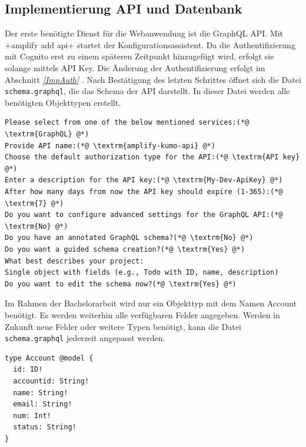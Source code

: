 \subsection{Implementierung API und Datenbank}
Der erste benötigte Dienst für die Webanwendung ist die GraphQL API.
Mit \spverb+amplify add api+ startet der Konfigurationsassistent.
Da die Authentifizierung mit Cognito erst zu einem späteren Zeitpunkt hinzugefügt wird, erfolgt sie solange mittels API Key.
Die Änderung der Authentifizierung erfolgt im Abschnitt \textit{\ref{ImpAuth} }.
Nach Bestätigung des letzten Schrittes öffnet sich die Datei \verb+schema.graphql+, die das Schema der API darstellt.
In dieser Datei werden alle benötigten Objekttypen erstellt.
\clearpage
\begin{lstlisting}[basicstyle=\ttfamily\small, breaklines=true , frame = single, backgroundcolor=\color{flashwhite} ]
Please select from one of the below mentioned services:(*@ \textrm{GraphQL} @*)
Provide API name:(*@ \textrm{amplify-kumo-api} @*)
Choose the default authorization type for the API:(*@ \textrm{API key} @*)
Enter a description for the API key:(*@ \textrm{My-Dev-ApiKey} @*)
After how many days from now the API key should expire (1-365):(*@ \textrm{7} @*)
Do you want to configure advanced settings for the GraphQL API:(*@ \textrm{No} @*)
Do you have an annotated GraphQL schema?(*@ \textrm{No} @*)
Do you want a guided schema creation?(*@ \textrm{Yes} @*)
What best describes your project:
Single object with fields (e.g., Todo with ID, name, description)
Do you want to edit the schema now?(*@ \textrm{Yes} @*)
\end{lstlisting}

Im Rahmen der Bachelorarbeit wird nur ein Objekttyp mit dem Namen Account benötigt.
Es werden weiterhin alle verfügbaren Felder angegeben.
Werden in Zukunft neue Felder oder weitere Typen benötigt, kann die Datei \verb+schema.graphql+ jederzeit angepasst werden.
\\
\begin{lstlisting}[basicstyle=\ttfamily\small, breaklines=true , frame = single, backgroundcolor=\color{flashwhite} ]
type Account @model {
  id: ID!
  accountid: String!
  name: String!
  email: String!
  num: Int!
  status: String!
}

\end{lstlisting}

